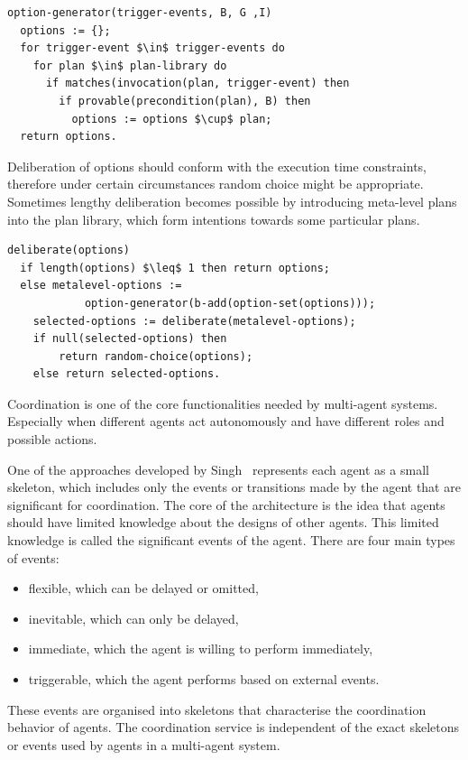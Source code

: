 \begin{lstlisting}[mathescape]
  option-generator(trigger-events, B, G ,I)
  options := {};
  for trigger-event $\in$ trigger-events do
    for plan $\in$ plan-library do
      if matches(invocation(plan, trigger-event) then
        if provable(precondition(plan), B) then
          options := options $\cup$ plan;
  return options.
\end{lstlisting}

Deliberation of options should conform with the execution time constraints, therefore under certain circumstances random choice might be appropriate.
Sometimes lengthy deliberation becomes possible by introducing meta-level plans into the plan library, which form intentions towards some particular plans.

\begin{lstlisting}[mathescape]
  deliberate(options)
  if length(options) $\leq$ 1 then return options;
  else metalevel-options :=
            option-generator(b-add(option-set(options)));
    selected-options := deliberate(metalevel-options);
    if null(selected-options) then
        return random-choice(options);
    else return selected-options.
\end{lstlisting}

Coordination is one of the core functionalities needed by multi-agent systems.
Especially when different agents act autonomously and have different roles and possible actions.

One of the approaches developed by Singh~\cite{Singh_97} represents each agent as a small skeleton, which includes only the events or transitions made by the agent that are significant for coordination.
The core of the architecture is the idea that agents should have limited knowledge about the designs of other agents.
This limited knowledge is called the significant events of the agent.
There are four main types of events:
\begin{itemize}
  \item flexible, which can be delayed or omitted,
  \item inevitable, which can only be delayed,
  \item immediate, which the agent is willing to perform immediately,
  \item triggerable, which the agent performs based on external events.
\end{itemize}
These events are organised into skeletons that characterise the coordination behavior of agents.
The coordination service is independent of the exact skeletons or events used by agents in a multi-agent system.

